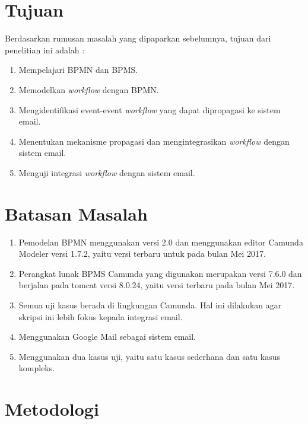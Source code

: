 \section{Tujuan}
\label{sec:tujuan}

Berdasarkan rumusan masalah yang dipaparkan sebelumnya, tujuan dari penelitian ini adalah :
\begin{enumerate}
	\item Mempelajari BPMN dan BPMS.
	\item Memodelkan \textit{workflow} dengan BPMN.
	\item Mengidentifikasi event-event \textit{workflow} yang dapat dipropagasi ke sistem email.
	\item Menentukan mekanisme propagasi dan mengintegrasikan \textit{workflow} dengan sistem email.
	\item Menguji integrasi \textit{workflow} dengan sistem email.
\end{enumerate}




\section{Batasan Masalah}
\label{sec:batasan}
\begin{enumerate}
	\item Pemodelan BPMN menggunakan versi 2.0 dan menggunakan editor Camunda Modeler versi 1.7.2, yaitu versi terbaru untuk pada bulan Mei 2017.
	\item Perangkat lunak BPMS Camunda yang digunakan merupakan versi 7.6.0 dan berjalan pada tomcat versi 8.0.24, yaitu versi terbaru pada bulan Mei 2017.
	\item Semua uji kasus berada di lingkungan Camunda. Hal ini dilakukan agar skripsi ini lebih fokus kepada integrasi email.
	\item Menggunakan Google Mail sebagai sistem email.
	\item Menggunakan dua kasus uji, yaitu satu kasus sederhana dan satu kasus kompleks.
\end{enumerate}




\section{Metodologi}
\label{sec:metlit}

